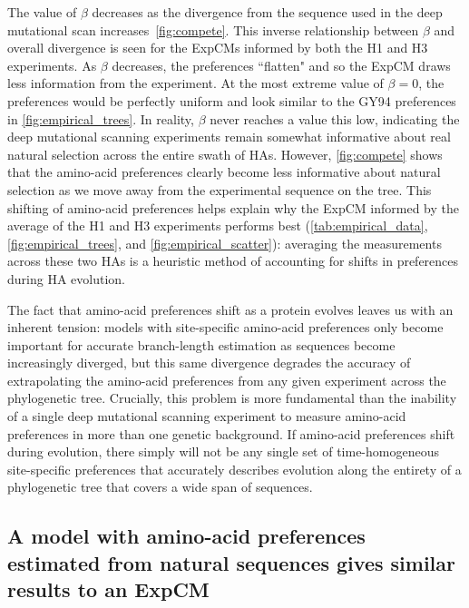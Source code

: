 \documentclass[11pt]{article}
\begin{document}
The value of $\beta$ decreases as the divergence from the sequence used in the deep mutational scan increases~\ref{fig:compete}. 
This inverse relationship between $\beta$ and overall divergence is seen for the ExpCMs informed by both the H1 and H3 experiments.
As $\beta$ decreases, the preferences ``flatten" and so the ExpCM draws less information from the experiment. 
At the most extreme value of $\beta = 0$, the preferences would be perfectly uniform and look similar to the GY94 preferences in \ref{fig:empirical_trees}.
In reality, $\beta$ never reaches a value this low, indicating the deep mutational scanning experiments remain somewhat informative about real natural selection across the entire swath of HAs. 
However, \ref{fig:compete} shows that the amino-acid preferences clearly become less informative about natural selection as we move away from the experimental sequence on the tree.
This shifting of amino-acid preferences helps explain why the ExpCM informed by the average of the H1 and H3 experiments performs best (\ref{tab:empirical_data}, \ref{fig:empirical_trees}, and \ref{fig:empirical_scatter}): averaging the measurements across these two HAs is a heuristic method of accounting for shifts in preferences during HA evolution. 
 
The fact that amino-acid preferences shift as a protein evolves leaves us with an inherent tension: models with site-specific amino-acid preferences only become important for accurate branch-length estimation as sequences become increasingly diverged, but this same divergence degrades the accuracy of extrapolating the amino-acid preferences from any given experiment across the phylogenetic tree.
Crucially, this problem is more fundamental than the inability of a single deep mutational scanning experiment to measure amino-acid preferences in more than one genetic background.
If amino-acid preferences shift during evolution, there simply will not be any single set of time-homogeneous site-specific preferences that accurately describes evolution along the entirety of a phylogenetic tree that covers a wide span of sequences.

\subsection*{A model with amino-acid preferences estimated from natural sequences gives similar results to an ExpCM}
\end{document}

